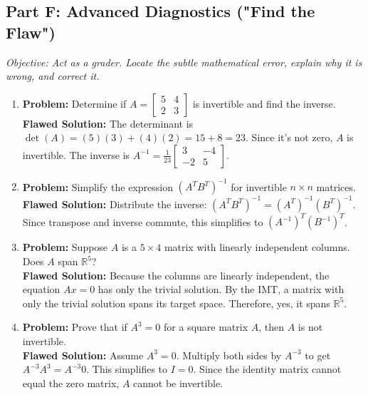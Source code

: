 \documentclass[12pt]{article}
\begin{document}
\subsection*{Part F: Advanced Diagnostics ("Find the Flaw")}
\textit{Objective: Act as a grader. Locate the subtle mathematical error, explain why it is wrong, and correct it.}

\begin{enumerate}[label=\textbf{\arabic*.}, resume]
    \item \textbf{Problem:} Determine if $A = \begin{bmatrix} 5 & 4 \\ 2 & 3 \end{bmatrix}$ is invertible and find the inverse. \\
    \textbf{Flawed Solution:} The determinant is $\det(A) = (5)(3) + (4)(2) = 15 + 8 = 23$. Since it's not zero, $A$ is invertible. The inverse is $A^{-1} = \frac{1}{23} \begin{bmatrix} 3 & -4 \\ -2 & 5 \end{bmatrix}$.
    
    \item \textbf{Problem:} Simplify the expression $(A^T B^T)^{-1}$ for invertible $n \times n$ matrices. \\
    \textbf{Flawed Solution:} Distribute the inverse: $(A^T B^T)^{-1} = (A^T)^{-1} (B^T)^{-1}$. Since transpose and inverse commute, this simplifies to $(A^{-1})^T (B^{-1})^T$.
    
    \item \textbf{Problem:} Suppose $A$ is a $5 \times 4$ matrix with linearly independent columns. Does $A$ span $\mathbb{R}^5$? \\
    \textbf{Flawed Solution:} Because the columns are linearly independent, the equation $Ax=0$ has only the trivial solution. By the IMT, a matrix with only the trivial solution spans its target space. Therefore, yes, it spans $\mathbb{R}^5$.
    
    \item \textbf{Problem:} Prove that if $A^3 = 0$ for a square matrix $A$, then $A$ is not invertible. \\
    \textbf{Flawed Solution:} Assume $A^3 = 0$. Multiply both sides by $A^{-3}$ to get $A^{-3}A^3 = A^{-3}0$. This simplifies to $I = 0$. Since the identity matrix cannot equal the zero matrix, $A$ cannot be invertible.
\end{enumerate}
\end{document}
